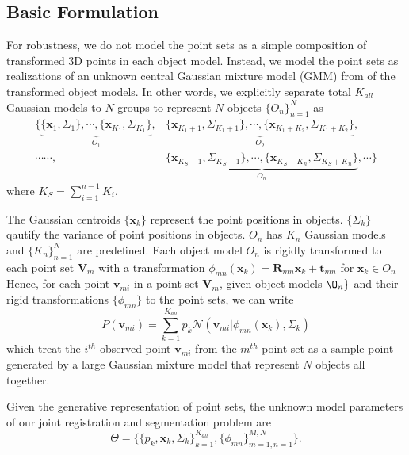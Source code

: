 \subsection{Basic Formulation}
For robustness, we do not model the point sets as a simple composition of transformed 3D points in each object model. Instead, we model the point sets as realizations of an unknown central Gaussian mixture model (GMM) from of the transformed object models. In other words, we explicitly separate total $K_{all}$ Gaussian models to $N$ groups to represent $N$ objects $\{O_n\}_{n=1}^N$ as
\begin{equation}
\begin{aligned}
\{
\underbrace{ \{\mathbf{x}_{1},\Sigma_{1}\}, \cdots, \{\mathbf{x}_{K_1},\Sigma_{K_1}\}  }_{O_1},&\underbrace{ \{\mathbf{x}_{K_1+1},\Sigma_{K_1+1}\}, \cdots, \{\mathbf{x}_{K_1+K_2},\Sigma_{K_1+K_2}\}  }_{O_2},\\ 
\cdots \cdots,& 
\underbrace{ \{\mathbf{x}_{K_S+1},\Sigma_{K_S+1}\},\cdots,\{\mathbf{x}_{K_S+K_n},\Sigma_{K_S+K_n}\}  }_{O_n},\cdots \}
\end{aligned}
\end{equation}
where $K_S = \sum_{i=1}^{n-1}K_i$.

The Gaussian centroids $\{\mathbf{x}_{k}\}$ represent the point positions in objects. $\{\Sigma_{k}\}$ qautify the variance of point positions in objects. $O_n$ has $K_n$ Gaussian models and $\{K_n\}_{n=1}^N$ are predefined.
Each object model $O_{n}$ is rigidly transformed to each point set $\mathbf{V}_m$ with a transformation $\phi_{mn}(\mathbf{x}_{k})=\mathbf{R}_{mn}\mathbf{x}_{k}+\mathbf{t}_{mn}$ for $\mathbf{x}_{k} \in O_n$
%
Hence, for each point $\mathbf{v}_{mi}$ in a point set $\mathbf{V}_m$, given object models $\O_{n}\}$ and their rigid transformations $\{\phi_{mn}\}$ to the point sets, we can write
\begin{equation}
\label{equ:model}
P(\mathbf{v}_{mi})=\sum^{K_{all}}_{k=1}p_k\mathcal{N}(\mathbf{v}_{mi}|\phi_{mn}(\mathbf{x}_k),\Sigma_k)
\end{equation}
which treat the $i^{th}$ observed point $\mathbf{v}_{mi}$ from the $m^{th}$ point set as a sample point generated by a large Gaussian mixture model that represent $N$ objects all together.

Given the generative representation of point sets, the unknown model parameters of our joint registration and segmentation problem are
%
\begin{equation}
\varTheta=\big \{\{p_k,\mathbf{x}_{k},\Sigma_k\}_{k=1}^{K_{all}},\{\phi_{mn}\}_{m=1,n=1}^{M,N}\big\}.
\end{equation}
 

